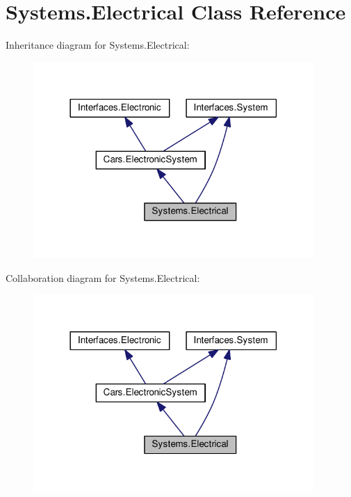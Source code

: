 \hypertarget{classSystems_1_1Electrical}{}\section{Systems.\+Electrical Class Reference}
\label{classSystems_1_1Electrical}


Inheritance diagram for Systems.\+Electrical\+:\nopagebreak
\begin{figure}[H]
\begin{center}
\leavevmode
\includegraphics[width=302pt]{classSystems_1_1Electrical__inherit__graph}
\end{center}
\end{figure}


Collaboration diagram for Systems.\+Electrical\+:
\nopagebreak
\begin{figure}[H]
\begin{center}
\leavevmode
\includegraphics[width=302pt]{classSystems_1_1Electrical__coll__graph}
\end{center}
\end{figure}
